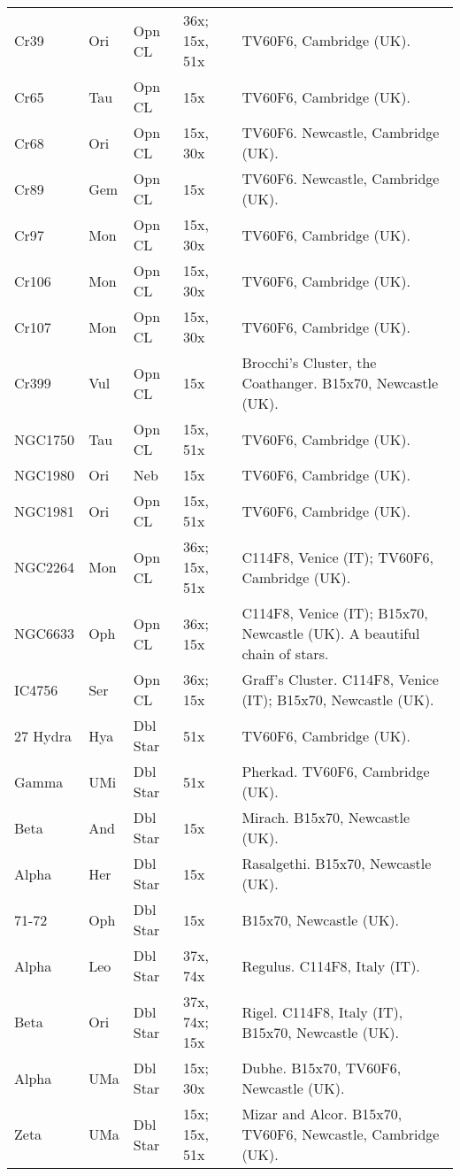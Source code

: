\begin{longtable}{ p{0.7in}  p{0.3in}  p{0.6in}  p{0.9in}  p{5.8in} }
Cr39 & Ori & Opn CL & 36x; 15x, 51x & TV60F6, Cambridge (UK). \\ 
Cr65 & Tau & Opn CL & 15x & TV60F6, Cambridge (UK). \\ 
Cr68 & Ori & Opn CL & 15x, 30x & TV60F6. Newcastle, Cambridge (UK). \\ 
Cr89 & Gem & Opn CL & 15x & TV60F6. Newcastle, Cambridge (UK). \\ 
Cr97 & Mon & Opn CL & 15x, 30x & TV60F6, Cambridge (UK). \\ 
Cr106 & Mon & Opn CL & 15x, 30x & TV60F6, Cambridge (UK). \\ 
Cr107 & Mon & Opn CL & 15x, 30x & TV60F6, Cambridge (UK). \\ 
Cr399 & Vul & Opn CL & 15x & Brocchi's Cluster, the Coathanger. B15x70, Newcastle (UK). \\ 
NGC1750 & Tau & Opn CL & 15x, 51x & TV60F6, Cambridge (UK). \\ 
NGC1980 & Ori & Neb & 15x & TV60F6, Cambridge (UK). \\ 
NGC1981 & Ori & Opn CL & 15x, 51x & TV60F6, Cambridge (UK). \\ 
NGC2264 & Mon & Opn CL & 36x; 15x, 51x & C114F8, Venice (IT); TV60F6, Cambridge (UK). \\ 
NGC6633 & Oph & Opn CL & 36x; 15x & C114F8, Venice (IT); B15x70, Newcastle (UK). A beautiful chain of stars. \\ 
IC4756 & Ser & Opn CL & 36x; 15x & Graff's Cluster. C114F8, Venice (IT); B15x70, Newcastle (UK). \\ 
27 Hydra & Hya & Dbl Star & 51x & TV60F6, Cambridge (UK). \\ 
Gamma & UMi & Dbl Star & 51x & Pherkad. TV60F6, Cambridge (UK). \\ 
Beta & And & Dbl Star & 15x & Mirach. B15x70, Newcastle (UK). \\ 
Alpha & Her & Dbl Star & 15x & Rasalgethi. B15x70, Newcastle (UK). \\ 
71-72 & Oph & Dbl Star & 15x & B15x70, Newcastle (UK). \\ 
Alpha & Leo & Dbl Star & 37x, 74x & Regulus. C114F8, Italy (IT). \\ 
Beta & Ori & Dbl Star & 37x, 74x; 15x & Rigel. C114F8, Italy (IT), B15x70, Newcastle (UK). \\ 
Alpha & UMa & Dbl Star & 15x; 30x & Dubhe. B15x70, TV60F6, Newcastle (UK). \\ 
Zeta & UMa & Dbl Star & 15x; 15x, 51x & Mizar and Alcor. B15x70, TV60F6, Newcastle, Cambridge (UK). \\ 

\end{longtable}
